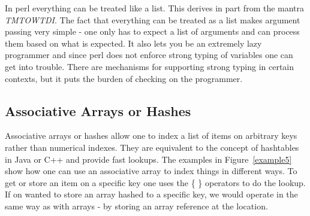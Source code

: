 \documentclass{article}
\begin{document}
In perl everything can be treated like a list.  This derives in part
from the mantra \emph{\it TMTOWTDI}.  The fact that everything can be
treated as a list makes argument passing very simple - one only has to
expect a list of arguments and can process them based on what is
expected.  It also lets you be an extremely lazy programmer and since
perl does not enforce strong typing of variables one can get into
trouble.  There are mechanisms for supporting strong typing in certain
contexts, but it puts the burden of checking on the programmer.

\subsection{Associative Arrays or Hashes}

Associative arrays or hashes allow one to index a list of items on
arbitrary keys rather than numerical indexes. They are equivalent to
the concept of hashtables in Java or C++ and provide fast lookups.
The examples in Figure~\ref{example5} show how one can use an
associative array to index things in different ways.  To get or store
an item on a specific key one uses the \{ \} operators to do the lookup. 
If on wanted to store an array hashed to a specific key, we would
operate in the same way as with arrays - by storing an array reference
at the location.  
\end{document}
